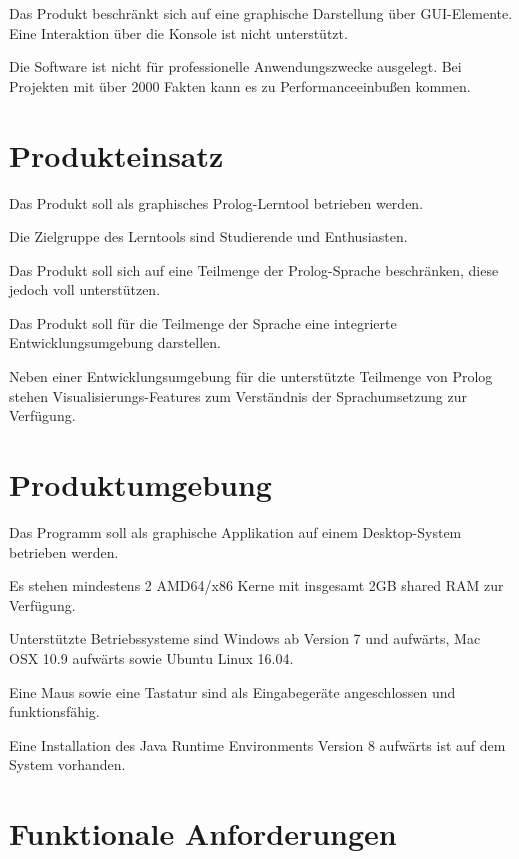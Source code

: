 \documentclass[parskip=full,11pt,twoside]{scrartcl}
\begin{document}
Das Produkt beschränkt sich auf eine graphische Darstellung über GUI-Elemente. Eine Interaktion über die Konsole ist nicht unterstützt.


Die Software ist nicht für professionelle Anwendungszwecke ausgelegt. Bei Projekten mit über 2000 Fakten kann es zu Performanceeinbußen kommen.

\pagebreak
\section{Produkteinsatz}

Das Produkt soll als graphisches Prolog-Lerntool betrieben werden.

Die Zielgruppe des Lerntools sind Studierende und Enthusiasten.

Das Produkt soll sich auf eine Teilmenge der Prolog-Sprache beschränken, diese jedoch voll unterstützen.

Das Produkt soll für die Teilmenge der Sprache eine integrierte Entwicklungsumgebung darstellen.

Neben einer Entwicklungsumgebung für die unterstützte Teilmenge von Prolog stehen Visualisierungs-Features zum Verständnis der Sprachumsetzung zur Verfügung.

\section{Produktumgebung}

Das Programm soll als graphische Applikation auf einem Desktop-System betrieben werden.

Es stehen mindestens 2 AMD64/x86 Kerne mit insgesamt 2GB shared RAM zur Verfügung.

Unterstützte Betriebssysteme sind Windows ab Version 7 und aufwärts, Mac OSX 10.9 aufwärts sowie Ubuntu Linux 16.04.

Eine Maus sowie eine Tastatur sind als Eingabegeräte angeschlossen und funktionsfähig.

Eine Installation des Java Runtime Environments Version 8 aufwärts ist auf dem System vorhanden.

\section{Funktionale Anforderungen}

\end{document}
